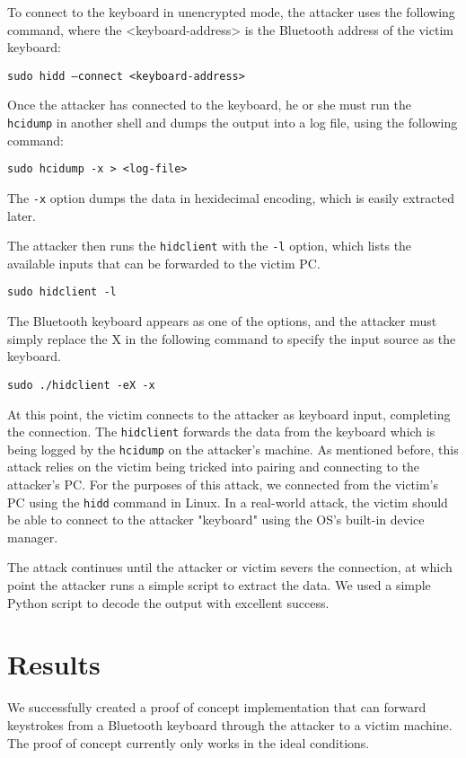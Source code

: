 \documentclass{acm_proc_article-sp}
\begin{document}
To connect to the keyboard in unencrypted mode, the attacker uses the following command, where the <keyboard-address> is the Bluetooth address of the victim keyboard:

\texttt{sudo hidd --connect <keyboard-address>}

Once the attacker has connected to the keyboard, he or she must run the \texttt{hcidump} in another shell and dumps the output into a log file, using the following command:

\texttt{sudo hcidump -x > <log-file>}

The \texttt{-x} option dumps the data in hexidecimal encoding, which is easily extracted later. 

The attacker then runs the \texttt{hidclient} with the \texttt{-l} option, which lists the available inputs that can be forwarded to the victim PC. 

\texttt{sudo hidclient -l}

The Bluetooth keyboard appears as one of the options, and the attacker must simply replace the X in the following command to specify the input source as the keyboard. 

\texttt{sudo ./hidclient -eX -x}

At this point, the victim connects to the attacker as keyboard input, completing the connection. The \texttt{hidclient} forwards the data from the keyboard which is being logged by the \texttt{hcidump} on the attacker's machine. As mentioned before, this attack relies on the victim being tricked into pairing and connecting to the attacker's PC. For the purposes of this attack, we connected from the victim's PC using the \texttt{hidd} command in Linux. In a real-world attack, the victim should be able to connect to the attacker "keyboard" using the OS's built-in device manager. 

The attack continues until the attacker or victim severs the connection, at which point the attacker runs a simple script to extract the data. We used a simple Python script to decode the output with excellent success.

\section{Results}
We successfully created a proof of concept implementation that can forward keystrokes from a Bluetooth keyboard through the attacker to a victim machine. The proof of concept currently only works in the ideal conditions.
\end{document}
